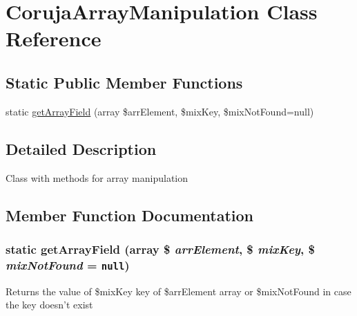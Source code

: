 \hypertarget{class_coruja_array_manipulation}{
\section{CorujaArrayManipulation Class Reference}
\label{class_coruja_array_manipulation}
}
\subsection*{Static Public Member Functions}
\begin{CompactItemize}
\item 
static \hyperlink{class_coruja_array_manipulation_dfbe48ec9869d5b1b6c86d6c85e2141c}{getArrayField} (array \$arrElement, \$mixKey, \$mixNotFound=null)
\end{CompactItemize}


\subsection{Detailed Description}
Class with methods for array manipulation 

\subsection{Member Function Documentation}
\hypertarget{class_coruja_array_manipulation_dfbe48ec9869d5b1b6c86d6c85e2141c}{
\subsubsection[{getArrayField}]{\setlength{\rightskip}{0pt plus 5cm}static getArrayField (array \$ {\em arrElement}, \/  \$ {\em mixKey}, \/  \$ {\em mixNotFound} = {\tt null})}}
\label{class_coruja_array_manipulation_dfbe48ec9869d5b1b6c86d6c85e2141c}


Returns the value of \$mixKey key of \$arrElement array or \$mixNotFound in case the key doesn't exist

